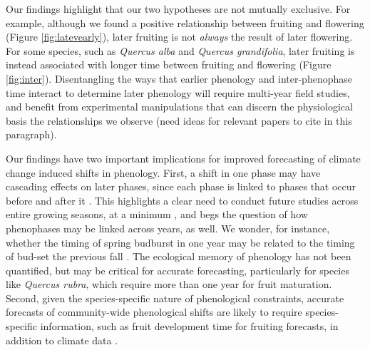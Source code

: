 \documentclass{article}
\begin{document}
\par Our findings highlight that our two hypotheses are not mutually exclusive. For example, although we found a positive relationship between fruiting and flowering (Figure \ref{fig:latevearly}), later fruiting is not \textit{always} the result of later flowering. For some species, such as \emph{Quercus alba} and \emph{Quercus grandifolia}, later fruiting is instead associated with longer time between fruiting and flowering (Figure \ref{fig:inter}). Disentangling the ways that earlier phenology and inter-phenophase time interact to determine later phenology will require multi-year field studies, and benefit from experimental manipulations that can discern the physiological basis the relationships we observe (need ideas for relevant papers to cite in this paragraph).

\par Our findings have two important implications for improved forecasting of climate change induced shifts in phenology. First, a shift in one phase may have cascading effects on later phases, since each phase is linked to phases that occur before and after it \citep{wolkovich2014b}. This highlights a clear need to conduct future studies across entire growing seasons, at a minimum \citep{wolkovich2014}, and begs the question of how phenophases may be linked across years, as well. We wonder, for instance, whether the timing of spring budburst in one year may be related to the timing of bud-set the previous fall \citep {mimura2010}. The ecological memory \citep {ogle2015} of phenology has not been quantified, but may be critical for accurate forecasting, particularly for species like \emph{Quercus rubra}, which require more than one year for fruit maturation. Second, given the species-specific nature of phenological constraints, accurate forecasts of community-wide phenological shifts are likely to require species-specific information, such as fruit development time for fruiting forecasts, in addition to climate data \citep{diez2012}. %
\end{document}
